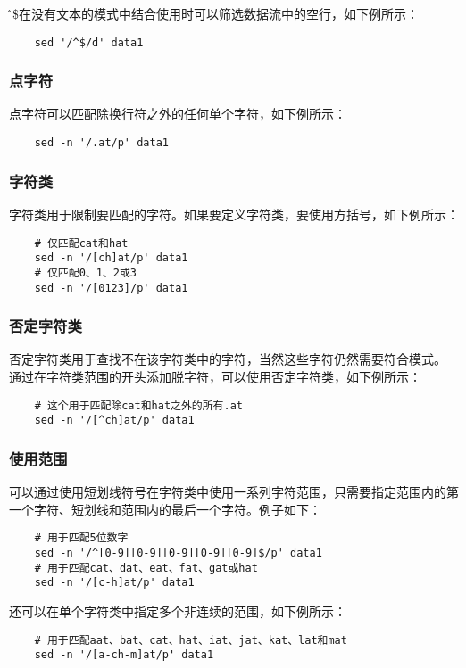\documentclass[a4paper,left=1.5cm,right=1.5cm,11pt]{article}
\begin{document}
	\^和\$在没有文本的模式中结合使用时可以筛选数据流中的空行，如下例所示：
	\begin{lstlisting}
	sed '/^$/d' data1
	\end{lstlisting}

\subsubsection{点字符}
	点字符可以匹配除换行符之外的任何单个字符，如下例所示：
	\begin{lstlisting}
	sed -n '/.at/p' data1
	\end{lstlisting}

\subsubsection{字符类}
	字符类用于限制要匹配的字符。如果要定义字符类，要使用方括号，如下例所示：
	\begin{lstlisting}
	# 仅匹配cat和hat
	sed -n '/[ch]at/p' data1
	# 仅匹配0、1、2或3
	sed -n '/[0123]/p' data1
	\end{lstlisting}

\subsubsection{否定字符类}
	否定字符类用于查找不在该字符类中的字符，当然这些字符仍然需要符合模式。
	通过在字符类范围的开头添加脱字符，可以使用否定字符类，如下例所示：
	\begin{lstlisting}
	# 这个用于匹配除cat和hat之外的所有.at
	sed -n '/[^ch]at/p' data1
	\end{lstlisting}

\subsubsection{使用范围}
	可以通过使用短划线符号在字符类中使用一系列字符范围，只需要指定范围内的第一个字符、短划线和范围内的最后一个字符。例子如下：
	\begin{lstlisting}
	# 用于匹配5位数字
	sed -n '/^[0-9][0-9][0-9][0-9][0-9]$/p' data1
	# 用于匹配cat、dat、eat、fat、gat或hat
	sed -n '/[c-h]at/p' data1
	\end{lstlisting}

	还可以在单个字符类中指定多个非连续的范围，如下例所示：
	\begin{lstlisting}
	# 用于匹配aat、bat、cat、hat、iat、jat、kat、lat和mat
	sed -n '/[a-ch-m]at/p' data1
	\end{lstlisting}
\end{document}
